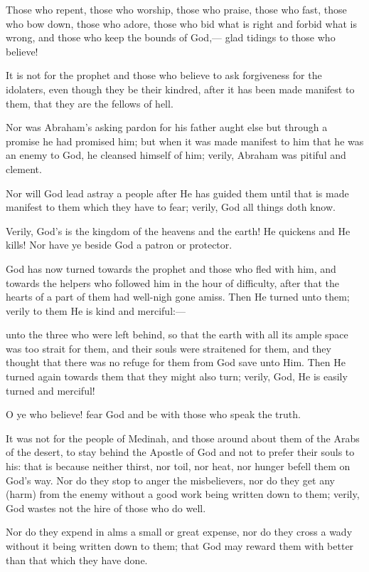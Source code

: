 \documentclass[fontsize=14pt, letterpaper, notitlepage, openany, DIV=12]{scrbook} %
\begin{document}
\noindent[9:112]
Those who repent, those who worship, those who praise, those who fast, those who bow
down, those who adore, those who bid what is right and forbid what is wrong, and those who
keep the bounds of God,--- glad tidings to those who believe!

\noindent[9:113]
It is not for the prophet and those who believe to ask forgiveness for the idolaters, even
though they be their kindred, after it has been made manifest to them, that they are the fellows of
hell.

\noindent[9:114]
Nor was Abraham's asking pardon for his father aught else but through a promise he had
promised him; but when it was made manifest to him that he was an enemy to God, he cleansed
himself of him; verily, Abraham was pitiful and clement.

\noindent[9:115]
Nor will God lead astray a people after He has guided them until that is made manifest to
them which they have to fear; verily, God all things doth know.

\noindent[9:116]
Verily, God's is the kingdom of the heavens and the earth! He quickens and He kills! Nor
have ye beside God a patron or protector.

\noindent[9:117]
God has now turned towards the prophet and those who fled with him, and towards the
helpers who followed him in the hour of difficulty, after that the hearts of a part of them had
well-nigh gone amiss. Then He turned unto them; verily to them He is kind and merciful:---

\noindent[9:118]
unto the three who were left behind, so that the earth with all its ample space was too
strait for them, and their souls were straitened for them, and they thought that there was no
refuge for them from God save unto Him. Then He turned again towards them that they might
also turn; verily, God, He is easily turned and merciful!

\noindent[9:119]
O ye who believe! fear God and be with those who speak the truth.

\noindent[9:120]
It was not for the people of Medinah, and those around about them of the Arabs of the
desert, to stay behind the Apostle of God and not to prefer their souls to his: that is because
neither thirst, nor toil, nor heat, nor hunger befell them on God's way. Nor do they stop to anger
the misbelievers, nor do they get any (harm) from the enemy without a good work being written
down to them; verily, God wastes not the hire of those who do well.

\noindent[9:121]
Nor do they expend in alms a small or great expense, nor do they cross a wady without it
being written down to them; that God may reward them with better than that which they have
done.
\end{document}
